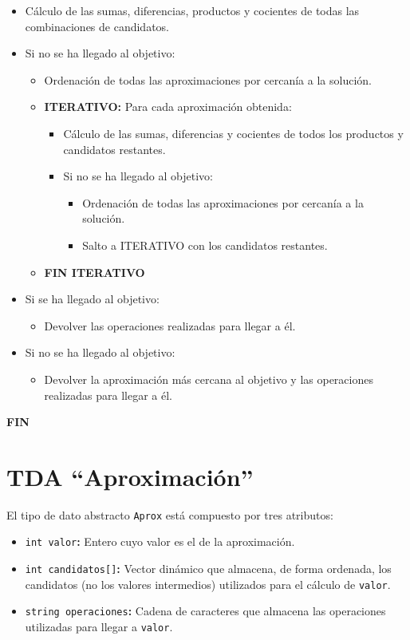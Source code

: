 \begin{itemize}
\item Cálculo de las sumas, diferencias, productos y cocientes de todas las combinaciones de candidatos.
\item Si no se ha llegado al objetivo:
	\begin{itemize}
	\item Ordenación de todas las aproximaciones por cercanía a la solución.
	\item\textbf{ITERATIVO:} Para cada aproximación obtenida:
		\begin{itemize}
		\item Cálculo de las sumas, diferencias y cocientes de todos los productos y candidatos restantes.
		\item Si no se ha llegado al objetivo:
			\begin{itemize}
			\item Ordenación de todas las aproximaciones por cercanía a la solución.
			\item Salto a ITERATIVO con los candidatos restantes.
			\end{itemize}
		\end{itemize}
	\item\textbf{FIN ITERATIVO}
	\end{itemize}
\item Si se ha llegado al objetivo:
	\begin{itemize}
	\item Devolver las operaciones realizadas para llegar a él.
	\end{itemize}
\item Si no se ha llegado al objetivo:
	\begin{itemize}
	\item Devolver la aproximación más cercana al objetivo y las operaciones realizadas para llegar a él.
	\end{itemize}
\end{itemize}

\textbf{FIN}

\pagebreak

\section{TDA ``Aproximación''}

El tipo de dato abstracto \texttt{Aprox} está compuesto por tres atributos:

\begin{itemize}
	\item\texttt{int valor}\textbf{:} Entero cuyo valor es el de la aproximación.
	\item\texttt{int candidatos[]}\textbf{:} Vector dinámico que almacena, de forma ordenada, los candidatos (no los valores intermedios) utilizados para el cálculo de \texttt{valor}.
	\item\texttt{string operaciones}\textbf{:} Cadena de caracteres que almacena las operaciones utilizadas para llegar a \texttt{valor}.
\end{itemize}

